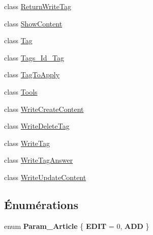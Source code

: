 \begin{DoxyCompactItemize}
\item 
class \hyperlink{class_pumgrana_1_1_return_write_tag}{Return\+Write\+Tag}
\item 
class \hyperlink{class_pumgrana_1_1_show_content}{Show\+Content}
\item 
class \hyperlink{class_pumgrana_1_1_tag}{Tag}
\item 
class \hyperlink{class_pumgrana_1_1_tags___id___tag}{Tags\+\_\+\+Id\+\_\+\+Tag}
\item 
class \hyperlink{class_pumgrana_1_1_tag_to_apply}{Tag\+To\+Apply}
\item 
class \hyperlink{class_pumgrana_1_1_tools}{Tools}
\item 
class \hyperlink{class_pumgrana_1_1_write_create_content}{Write\+Create\+Content}
\item 
class \hyperlink{class_pumgrana_1_1_write_delete_tag}{Write\+Delete\+Tag}
\item 
class \hyperlink{class_pumgrana_1_1_write_tag}{Write\+Tag}
\item 
class \hyperlink{class_pumgrana_1_1_write_tag_answer}{Write\+Tag\+Answer}
\item 
class \hyperlink{class_pumgrana_1_1_write_update_content}{Write\+Update\+Content}
\end{DoxyCompactItemize}
\subsection*{Énumérations}
\begin{DoxyCompactItemize}
\item 
\hypertarget{namespace_pumgrana_a748df91eea2577535be6903b7aae4eca}{enum {\bfseries Param\+\_\+\+Article} \{ {\bfseries E\+D\+I\+T} = 0, 
{\bfseries A\+D\+D}
 \}}\label{namespace_pumgrana_a748df91eea2577535be6903b7aae4eca}

\end{DoxyCompactItemize}
